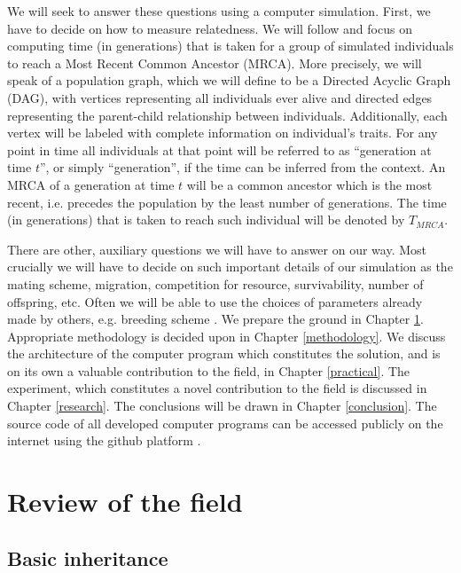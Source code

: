 \documentclass{l4proj}
\begin{document}
We will seek to answer these questions using a computer simulation. First, we have to decide on how to measure relatedness. We will follow \textcite{rohde04} and focus on computing time (in generations) that is taken for a group of simulated individuals to reach a Most Recent Common Ancestor (MRCA). More precisely, we will speak of a \gls{population graph}, which we will define to be a Directed Acyclic Graph (DAG), with vertices representing all individuals ever alive and directed edges representing the parent-child relationship between individuals. Additionally, each vertex will be labeled with complete information on individual's traits. For any point in time all individuals at that point will be referred to as ``generation at time $t$'', or simply ``generation'', if the time can be inferred from the context. An MRCA of a generation at time $t$ will be a common ancestor which is the most recent, i.e. precedes the population by the least number of generations. The time (in generations) that is taken to reach such individual will be denoted by $T_{MRCA}$.

There are other, auxiliary questions we will have to answer on our way. Most crucially we will have to decide on such important details of our simulation as the mating scheme, migration, competition for resource, survivability, number of offspring, etc. Often we will be able to use the choices of parameters already made by others, e.g. breeding scheme \parencite{peng10}. We prepare the ground in Chapter \ref{review}. Appropriate methodology is decided upon in Chapter \ref{methodology}. We discuss the architecture of the computer program which constitutes the solution, and is on its own a valuable contribution to the field, in Chapter \ref{practical}. The experiment, which constitutes a novel contribution to the field is discussed in Chapter \ref{research}. The conclusions will be drawn in Chapter \ref{conclusion}. The source code of all developed computer programs can be accessed publicly on the internet using the github platform \parencite{Kurkiewicz16}.


\chapter{Review of the field}\label{review}

\section{Basic inheritance}
\end{document}
